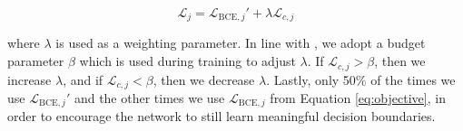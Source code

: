 \begin{equation}
    \mathcal{L}_{j} = \mathcal{L}_{\text{BCE}, j}' + \lambda \mathcal{L}_{c, j}
\end{equation}

\noindent where $\lambda$ is used as a weighting parameter. In line with \cite{devries2018learning}, we adopt a budget parameter $\beta$ which is used during training to adjust $\lambda$. If $\mathcal{L}_{c, j} > \beta$, then we increase $\lambda$, and if $\mathcal{L}_{c, j} < \beta$, then we decrease $\lambda$. Lastly, only 50\% of the times we use $\mathcal{L}_{\text{BCE}, j}'$ and the other times we use $\mathcal{L}_{\text{BCE}, j}$ from Equation \ref{eq:objective}, in order to encourage the network to still learn meaningful decision boundaries. 